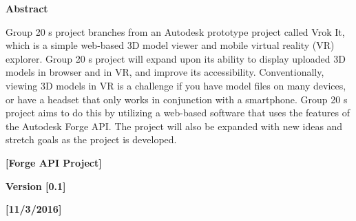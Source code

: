 \documentclass[letterpaper, 10pt, draftclsnofoot, onecolumn]{IEEEtran}
\begin{document}
{\centering{}\bfseries\color{black}
Abstract
\par}

{\centering{}\mdseries\color{black}
Group 20 s project branches from an Autodesk prototype project called Vrok It, which is a simple web-based 3D model viewer and mobile virtual reality (VR) explorer. Group 20 s project will expand upon its ability to display uploaded 3D models in browser and in VR, and improve its accessibility. Conventionally, viewing 3D models in VR is a challenge if you have model files on many devices, or have a headset that only works in conjunction with a smartphone. Group 20 s project aims to do this by utilizing a web-based software that uses the features of the Autodesk Forge API. The project will also be expanded with new ideas and stretch goals as the project is developed.
\par}

\bigskip


\bigskip



\bigskip

{\centering{}\bfseries\color{black}
[Forge API Project]
\par}


\bigskip


\bigskip


\bigskip
\begin{comment}
	{\centering\selectlanguage{english}\bfseries\color{black}
	\foreignlanguage{english}{[}\foreignlanguage{english}{replace \ image
	above with a cooler logo]}
	\par}
\end{comment}
\begin{figure}
\centering
\end{figure}

\bigskip


\bigskip

{\centering{}\bfseries\color{black}
Version [0.1]
\par}

{\centering{}\bfseries\color{black}
[11/3/2016]
\par}


\bigskip
\end{document}
